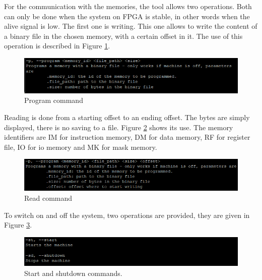 For the communication with the memories, the tool allows two operations. Both can only be done 
when the system on FPGA is stable, in other words when the alive signal is low. The first one is 
writing. This one allows to write the content of a binary file in the chosen memory, with a certain 
offset in it. The use of this operation is described in Figure \ref{fig:tools/program}.

\begin{figure}[H]
    \centering
    \includegraphics[scale=1]{Chapter7-Tools-Demos/res/utils_program.PNG}
    \caption{Program command}
    \label{fig:tools/program}
\end{figure}

Reading is done from a starting 
offset to an ending offset. The bytes are simply displayed, there is no saving to a file. 
Figure \ref{fig:tools/read} shows its use. The memory identifiers are IM for 
instruction memory, DM for data memory, RF for register file, IO for io memory and MK for mask 
memory.

\begin{figure}[H]
    \centering
    \includegraphics[scale=1]{Chapter7-Tools-Demos/res/utils_read.PNG}
    \caption{Read command}
    \label{fig:tools/read}
\end{figure}

To switch on and off the system, two operations are provided, they are given in 
Figure \ref{fig:tools/st_sd}.

\begin{figure}[H]
    \centering
    \includegraphics[scale=1]{Chapter7-Tools-Demos/res/utils_power.PNG}
    \caption{Start and shutdown commands.}
    \label{fig:tools/st_sd}
\end{figure}


